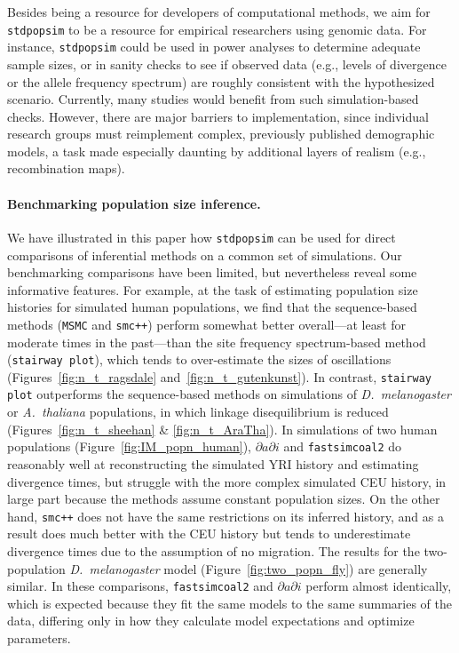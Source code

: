 \documentclass[12pt,halfline,a4paper]{ouparticle}
\newcommand{\stdpopsim}{\texttt{stdpopsim}\xspace}
\newcommand{\dadi}{$\partial a \partial i$\xspace}
\newcommand{\MSMC}{\texttt{MSMC}\xspace}
\newcommand{\smcpp}{\texttt{smc++}\xspace}
\newcommand{\stairwayplot}{\texttt{stairway plot}\xspace}
\newcommand{\fastsimcoal}{\texttt{fastsimcoal2}\xspace}
\begin{document}
Besides being a resource for developers of computational methods,
we aim for \stdpopsim to be a resource for empirical researchers using genomic data.
For instance, \stdpopsim could be used in power analyses to determine adequate sample sizes,
or in sanity checks to see if observed data
(e.g., levels of divergence or the allele frequency spectrum)
are roughly consistent with the hypothesized scenario.
Currently, many studies would benefit from such simulation-based checks.
However,  there are major barriers to implementation,
since individual research groups must reimplement complex, previously published demographic models,
a task made especially daunting by additional layers of realism (e.g., recombination maps).

\paragraph{Benchmarking population size inference.}
We have illustrated in this paper how \stdpopsim can be used for direct
comparisons of inferential methods on a common set of simulations. Our
benchmarking comparisons have been limited, but nevertheless
reveal some informative features.
For example, at the task of estimating population size histories for simulated human
populations, we find that the sequence-based methods (\MSMC and \smcpp)
perform somewhat better overall---at least for moderate times in the past---than
the site frequency spectrum-based method (\stairwayplot),
which tends to over-estimate the sizes of oscillations
(Figures~\ref{fig:n_t_ragsdale} and~\ref{fig:n_t_gutenkunst}).
In contrast, \stairwayplot outperforms the sequence-based methods
on simulations of \textit{D.~melanogaster} or \textit{A.~thaliana} populations,
in which linkage disequilibrium is reduced (Figures~\ref{fig:n_t_sheehan} \& \ref{fig:n_t_AraTha}).
In simulations of two human populations
(Figure~\ref{fig:IM_popn_human}), \dadi and \fastsimcoal do reasonably well at
reconstructing the simulated YRI history and estimating divergence times, but struggle with the more complex simulated CEU
history, in large part because the methods assume constant population sizes.
On the other hand, \smcpp does not have the same
restrictions on its inferred history, and as a result does much better
with the CEU history but tends to underestimate divergence times
due to the assumption of no migration.
The results for the two-population \textit{D.~melanogaster} model (Figure~\ref{fig:two_popn_fly}) are generally similar.
In these comparisons, \fastsimcoal and \dadi perform almost identically, which is expected because they fit the same models to the same summaries of the data,
differing only in how they calculate model expectations and optimize parameters.
\end{document}
